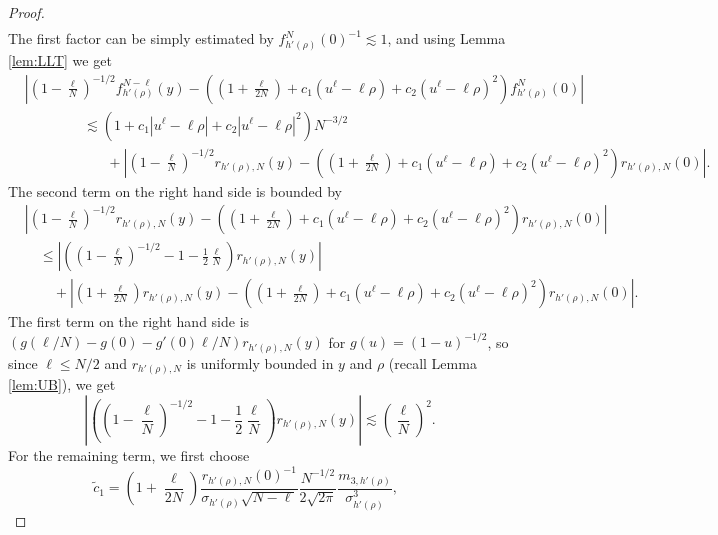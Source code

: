 \documentclass[11pt, a4paper]{article}
\newcommand{\1}{\mathbf{1}}
\begin{document}
\begin{proof}
\begin{align*}
  \end{align*}
  The first factor can be simply estimated by $f^N_{h' (\rho)} (0)^{- 1}
  \lesssim 1$, and using Lemma \ref{lem:LLT} we get
  \begin{align*}
     &\left| \left( 1 - \frac{\ell}{N} \right)^{- 1 / 2} f^{N - \ell}_{h'
     (\rho)} (y) - \left( \left( 1 + \frac{\ell}{2 N} \right) + c_1 (u^{\ell}
     - \ell \rho) + c_2 (u^{\ell} - \ell \rho)^2 \right) f^N_{h' (\rho)} (0)
     \right| \\
     & \hspace{50pt} \lesssim (1 + c_1 | u^{\ell} - \ell \rho | + c_2 | u^{\ell} - \ell \rho
     |^2) N^{- 3 / 2} \\
     & \hspace{70pt} + \left| \left( 1 - \frac{\ell}{N} \right)^{- 1 / 2} r_{h' (\rho), N} (y)
     - \left( \left( 1 + \frac{\ell}{2 N} \right) + c_1 (u^{\ell} - \ell \rho)
     + c_2 (u^{\ell} - \ell \rho)^2 \right) r_{h' (\rho), N} (0) \right| . 
   \end{align*}
  The second term on the right hand side is bounded by
  \begin{align*}
   &\left| \left( 1 - \frac{\ell}{N} \right)^{- 1 / 2} r_{h' (\rho), N} (y) -
   \left( \left( 1 + \frac{\ell}{2 N} \right) + c_1 (u^{\ell} - \ell \rho) +
   c_2 (u^{\ell} - \ell \rho)^2 \right) r_{h' (\rho), N} (0) \right| \\
   &\quad \leqslant \left| \left( \left( 1 - \frac{\ell}{N} \right)^{- 1 / 2} - 1 -
   \frac{1}{2} \frac{\ell}{N} \right) r_{h' (\rho), N} (y) \right| \\
   &\qquad + \left| \left( 1 + \frac{\ell}{2 N} \right) r_{h' (\rho), N} (y) -
   \left( \left( 1 + \frac{\ell}{2 N} \right) + c_1 (u^{\ell} - \ell \rho) +
   c_2 (u^{\ell} - \ell \rho)^2 \right) r_{h' (\rho), N} (0) \right|.
  \end{align*}
  The first term on the right hand side is $(g (\ell / N) - g (0) - g' (0)
  \ell / N) r_{h' (\rho), N} (y)$ for $g (u) = (1 - u)^{- 1 / 2}$, so since
  $\ell \leqslant N / 2$ and $r_{h' (\rho), N}$ is uniformly bounded in $y$
  and $\rho$ (recall Lemma \ref{lem:UB}), we get
  \[ \left| \left( \left( 1 - \frac{\ell}{N} \right)^{- 1 / 2} - 1 -
     \frac{1}{2} \frac{\ell}{N} \right) r_{h' (\rho), N} (y) \right| \lesssim
     \left( \frac{\ell}{N} \right)^2 . \]
  For the remaining term, we first choose
  \[ \tilde{c}_1 = \left( 1 + \frac{\ell}{2 N} \right) \frac{r_{h' (\rho), N}
     (0)^{- 1}}{\sigma_{h' (\rho)} \sqrt{N - \ell}} \frac{N^{- 1 / 2}}{2
     \sqrt{2 \pi}} \frac{m_{3, h' (\rho)}}{\sigma^3_{h' (\rho)}}, \hspace{2em}
\]
\end{proof}
\end{document}
